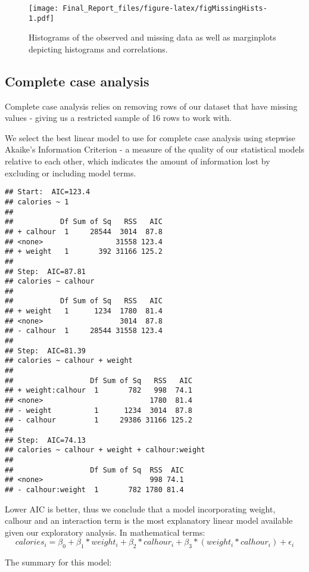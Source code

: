 \documentclass[]{article}
\theoremstyle{definition}
\theoremstyle{definition}
\theoremstyle{definition}
\theoremstyle{remark}
\begin{document}
\begin{figure}[htbp]
\centering
\texttt{[image: Final\_Report\_files/figure-latex/figMissingHists-1.pdf]}
\caption{\label{fig:figMissingHists}\label{fig:MissingHists}Histograms of
the observed and missing data as well as marginplots depicting
histograms and correlations.}
\end{figure}

\subsection{Complete case analysis}\label{complete-case-analysis}

Complete case analysis relies on removing rows of our dataset that have
missing values - giving us a restricted sample of 16 rows to work with.

We select the best linear model to use for complete case analysis using
stepwise Akaike's Information Criterion - a measure of the quality of
our statistical models relative to each other, which indicates the
amount of information lost by excluding or including model terms.

\begin{verbatim}
## Start:  AIC=123.4
## calories ~ 1
## 
##           Df Sum of Sq   RSS   AIC
## + calhour  1     28544  3014  87.8
## <none>                 31558 123.4
## + weight   1       392 31166 125.2
## 
## Step:  AIC=87.81
## calories ~ calhour
## 
##           Df Sum of Sq   RSS   AIC
## + weight   1      1234  1780  81.4
## <none>                  3014  87.8
## - calhour  1     28544 31558 123.4
## 
## Step:  AIC=81.39
## calories ~ calhour + weight
## 
##                  Df Sum of Sq   RSS   AIC
## + weight:calhour  1       782   998  74.1
## <none>                         1780  81.4
## - weight          1      1234  3014  87.8
## - calhour         1     29386 31166 125.2
## 
## Step:  AIC=74.13
## calories ~ calhour + weight + calhour:weight
## 
##                  Df Sum of Sq  RSS  AIC
## <none>                         998 74.1
## - calhour:weight  1       782 1780 81.4
\end{verbatim}

Lower AIC is better, thus we conclude that a model incorporating weight,
calhour and an interaction term is the most explanatory linear model
available given our exploratory analysis. In mathematical terms: \[
calories_i = \beta_0 + \beta_1*weight_i + \beta_2*calhour_i + \beta_3*(weight_i*calhour_i) + \epsilon_i
\]

The summary for this model:
\end{document}
